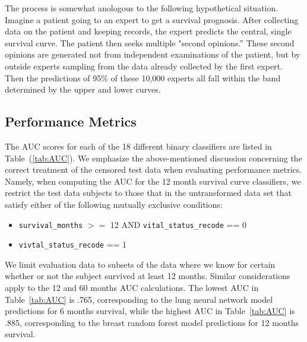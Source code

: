 \documentclass[10pt,letterpaper]{article}
\newcommand{\codewhite}[1]{\colorbox{white}{\texttt{#1}}}
\begin{document}
The process is somewhat anologous to the following hypothetical situation. Imagine a patient going to an expert to get a survival prognosis.
After collecting data on the patient and keeping records, the expert predicts the central, single survival curve. The patient then seeks multiple "second opinions.'' These second opinions are generated not from independent examinations of the patient, but by outside experts sampling from the data already collected by the first expert.
Then the predictions of 95\% of these 10,000 experts all fall within the band determined by the upper and lower curves.





\subsection*{Performance Metrics}
\label{sec:performancemetrics}



The AUC scores for each of the 18 different binary classifiers are listed in Table~(\ref{tab:AUC}). We emphasize the above-mentioned discussion concerning the correct treatment of the censored test data when evaluating performance metrics.
Namely, when computing the AUC for the 12 month survival curve classifiers, we restrict the test data subjects to those that in the untransformed data set that satisfy either of the following mutually exclusive conditions:



\begin{itemize}[noitemsep]
\item \codewhite{survival\_months} $>=$ 12 AND \codewhite{vital\_status\_recode} == 0
\item \codewhite{vivtal\_status\_recode} == 1
\end{itemize}

We limit evaluation data to subsets of the data where we know for certain whether or not the subject survived at least 12 months. Similar considerations apply to the 12 and 60 months AUC calculations. The lowest AUC in Table~\ref{tab:AUC} is .765, corresponding to the lung neural network model predictions for 6 months survival, while the highest AUC in Table~\ref{tab:AUC} is .885, corresponding to the breast random forest model predictions for 12 months survival.
\end{document}
